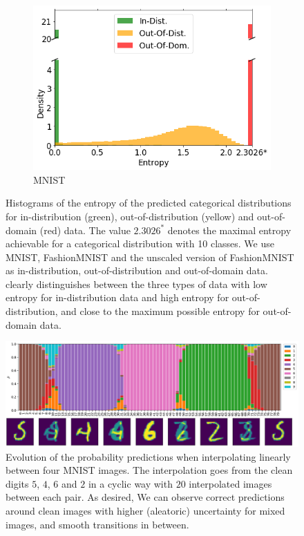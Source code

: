 \begin{figure}[ht]
    \centering
    \begin{subfigure}[t]{.5 \columnwidth}
        \centering
        \includegraphics[width=1 \textwidth]{sections/006_neurips2020/figures/entropy_MNIST.png}
        \caption{MNIST}    
        \end{subfigure}%
    \caption{Histograms of the entropy of the predicted categorical distributions for in-distribution (green), out-of-distribution (yellow) and out-of-domain (red) data. The value $2.3026^*$ denotes the maximal entropy achievable for a categorical distribution with 10 classes. We use MNIST, FashionMNIST and the unscaled version of FashionMNIST as in-distribution, out-of-distribution and out-of-domain data. \PostNetacro clearly distinguishes between the three types of data with low entropy for in-distribution data and high entropy for out-of-distribution, and close to the maximum possible entropy for out-of-domain data.}
    \label{entropy_MNIST}
\end{figure}

\begin{figure}[ht]
    \centering
        \includegraphics[width=.9 \textwidth]{sections/006_neurips2020/figures/image_interpolation_uncertainty3.pdf}
        
    \caption{Evolution of the probability predictions when interpolating linearly between four MNIST images. The interpolation goes from the clean digits $5$, $4$, $6$ and $2$ in a cyclic way with $20$ interpolated images between each pair. As desired, We can observe correct predictions around clean images with higher (aleatoric) uncertainty for mixed images, and smooth transitions in between.}
    \label{aleatoric_interpolation}
\end{figure}

